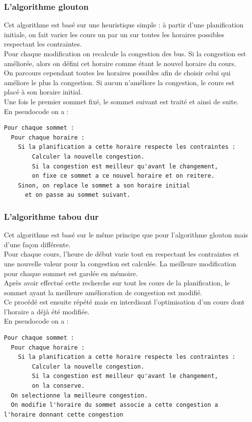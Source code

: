 \documentclass[a4paper,11pt]{article}
\begin{document}
		\subsubsection{L'algorithme glouton}
			Cet algorithme est basé sur une heuristique simple : à partir d'une planification initiale, on fait varier les cours un par un sur toutes les horaires possibles respectant les contraintes.\\
			Pour chaque modification on recalcule la congestion des bus. Si la congestion est améliorée, alors on défini cet horaire comme étant le nouvel horaire du cours.\\
			On parcours cependant toutes les horaires possibles afin de choisir celui qui améliore le plus la congestion. Si aucun n'améliore la congestion, le cours est placé à son horaire initial.\\
			Une fois le premier sommet fixé, le sommet suivant est traité et ainsi de suite.\\
			En pseudocode on a :\\
\begin{lstlisting}
Pour chaque sommet :
  Pour chaque horaire :
  	Si la planification a cette horaire respecte les contraintes :
    	Calculer la nouvelle congestion.
    	Si la congestion est meilleur qu'avant le changement,
      	on fixe ce sommet a ce nouvel horaire et on reitere. 
    Sinon, on replace le sommet a son horaire initial 
      et on passe au sommet suivant.
		\end{lstlisting}

		\subsubsection{L'algorithme tabou dur}
			Cet algorithme est basé sur le même principe que pour l'algorithme glouton mais d'une façon différente.\\
			Pour chaque cours, l'heure de début varie tout en respectant les contraintes et une nouvelle valeur pour la congestion est calculée. La meilleure modification pour chaque sommet est gardée en mémoire.\\
			Après avoir effectué cette recherche sur tout les cours de la planification, le sommet ayant la meilleure amélioration de congestion est modifié.\\
			Ce procédé est ensuite répété mais en interdisant l'optimisation d'un cours dont l'horaire a déjà été modifiée.\\
			En pseudocode on a :\\
\begin{lstlisting}
Pour chaque sommet :
  Pour chaque horaire :
  	Si la planification a cette horaire respecte les contraintes :
    	Calculer la nouvelle congestion.
    	Si la congestion est meilleur qu'avant le changement,
      	on la conserve.
  On selectionne la meilleure congestion. 
  On modifie l'horaire du sommet associe a cette congestion a l'horaire donnant cette congestion
		\end{lstlisting}
\end{document}
